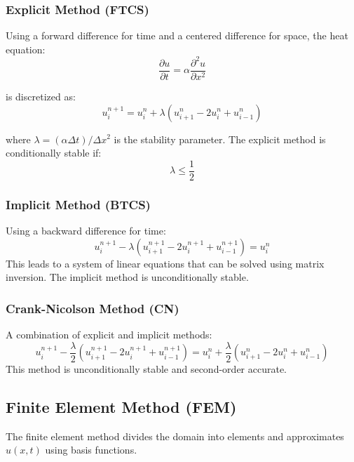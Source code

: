 \subsubsection{Explicit Method (FTCS)}
Using a forward difference for time and a centered difference for space, the heat equation:
\begin{equation}
\frac{\partial u}{\partial t} = \alpha \frac{\partial^2 u}{\partial x^2}
\end{equation}

is discretized as:
\begin{equation}
    u_i^{n+1} = u_i^n + \lambda (u_{i+1}^n - 2u_i^n + u_{i-1}^n)
\end{equation}

where $\lambda = (\alpha \Delta t)/\Delta x^2$ is the stability parameter. The explicit method is conditionally stable if:
\begin{equation}
    \lambda \leq \frac{1}{2}
\end{equation}

\subsubsection{Implicit Method (BTCS)}
Using a backward difference for time:
\begin{equation}
    u_i^{n+1} - \lambda (u_{i+1}^{n+1} - 2u_i^{n+1} + u_{i-1}^{n+1}) = u_i^n
\end{equation}
This leads to a system of linear equations that can be solved using matrix inversion. The implicit method is unconditionally stable.

\subsubsection{Crank-Nicolson Method (CN)}
A combination of explicit and implicit methods:
\begin{equation}
    u_i^{n+1} - \frac{\lambda}{2} (u_{i+1}^{n+1} - 2u_i^{n+1} + u_{i-1}^{n+1}) = u_i^n + \frac{\lambda}{2} (u_{i+1}^n - 2u_i^n + u_{i-1}^n)
\end{equation}
This method is unconditionally stable and second-order accurate.

\subsection{Finite Element Method (FEM)}
The finite element method divides the domain into elements and approximates $u(x,t)$ using basis functions.


